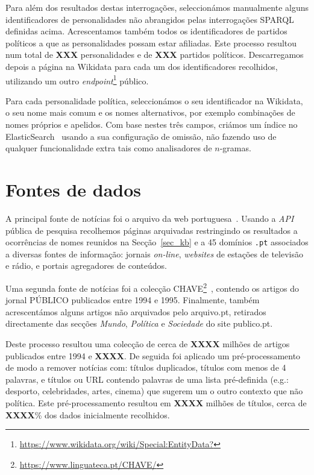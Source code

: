 \documentclass[a4paper, twocolumn, 11pt, twoside]{article}
\begin{document}
Para além dos resultados destas interrogações, seleccionámos manualmente alguns identificadores de personalidades não abrangidos pelas interrogações SPARQL definidas acima. Acrescentamos também todos os identificadores de partidos políticos a que as personalidades possam estar afiliadas. Este processo resultou num total de {\bf XXX} personalidades e de {\bf XXX} partidos políticos. Descarregamos depois a página na Wikidata para cada um dos identificadores recolhidos, utilizando um outro \textit{endpoint}\footnote{\url{https://www.wikidata.org/wiki/Special:EntityData?}} público.

Para cada personalidade política, seleccionámos o seu identificador na Wikidata, o seu nome mais comum e os nomes alternativos, por exemplo combinações de nomes próprios e apelidos. Com base nestes três campos, criámos um índice no ElasticSearch~\citep{10.5555/2904394} usando a sua configuração de omissão, não fazendo uso de qualquer funcionalidade extra tais como analisadores de $n$-gramas.


\section{Fontes de dados}
\label{sec:data_sources}

A principal fonte de notícias foi o arquivo da web portuguesa~\citep{SearchPastPWA2013}. Usando a \textit{API} pública de pesquisa recolhemos páginas arquivadas restringindo os resultados a ocorrências de nomes reunidos na Secção~\ref{sec_kb} e a 45 domínios \texttt{.pt} associados a diversas fontes de informação: jornais \textit{on-line}, \textit{websites} de estações de televisão e rádio, e portais agregadores de conteúdos. 

Uma segunda fonte de notícias foi a colecção CHAVE\footnote{\url{https://www.linguateca.pt/CHAVE/}}~\citep{DBLP:conf/clef/SantosR04, santos-rocha-2001-evaluating}, contendo os artigos do jornal PÚBLICO publicados entre 1994 e 1995. Finalmente, também acrescentámos alguns artigos não arquivados pelo arquivo.pt, retirados directamente das secções {\it Mundo}, {\it Política} e {\it Sociedade} do site publico.pt. 

Deste processo resultou uma colecção de cerca de \textbf{XXXX} milhões de artigos publicados entre 1994 e \textbf{XXXX}. De seguida foi aplicado um pré-processamento de modo a remover notícias com: títulos duplicados, títulos com menos de 4 palavras, e títulos ou URL contendo palavras de uma lista pré-definida (e.g.: desporto, celebridades, artes, cinema) que sugerem um o outro contexto que não política. Este pré-processamento resultou em \textbf{XXXX} milhões de títulos, cerca de \textbf{XXXX}\% dos dados inicialmente recolhidos.
\end{document}
